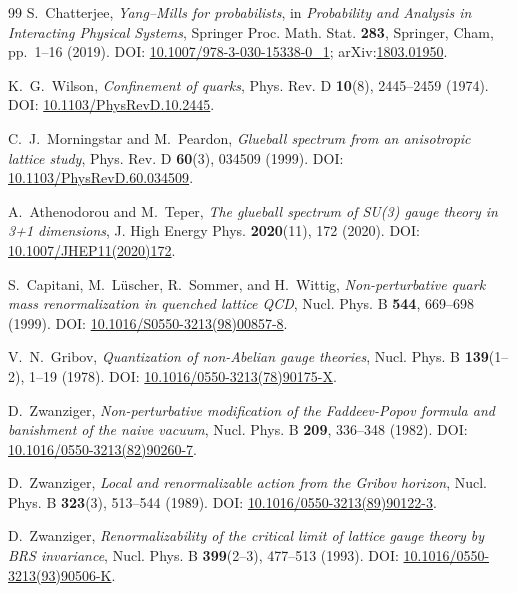\documentclass[11pt,a4paper]{amsart}
\theoremstyle{definition}
\begin{document}
\begin{thebibliography}{99}
S.~Chatterjee, \emph{Yang--Mills for probabilists}, in \emph{Probability and Analysis in Interacting Physical Systems}, Springer Proc. Math. Stat. \textbf{283}, Springer, Cham, pp.~1--16 (2019). DOI: \href{https://doi.org/10.1007/978-3-030-15338-0_1}{10.1007/978-3-030-15338-0\_1}; arXiv:\href{https://arxiv.org/abs/1803.01950}{1803.01950}.

K.~G.~Wilson, \emph{Confinement of quarks}, Phys. Rev. D \textbf{10}(8), 2445--2459 (1974). DOI: \href{https://doi.org/10.1103/PhysRevD.10.2445}{10.1103/PhysRevD.10.2445}.

C.~J.~Morningstar and M.~Peardon, \emph{Glueball spectrum from an anisotropic lattice study}, Phys. Rev. D \textbf{60}(3), 034509 (1999). DOI: \href{https://doi.org/10.1103/PhysRevD.60.034509}{10.1103/PhysRevD.60.034509}.

A.~Athenodorou and M.~Teper, \emph{The glueball spectrum of SU(3) gauge theory in 3+1 dimensions}, J. High Energy Phys. \textbf{2020}(11), 172 (2020). DOI: \href{https://doi.org/10.1007/JHEP11(2020)172}{10.1007/JHEP11(2020)172}.

S.~Capitani, M.~L\"uscher, R.~Sommer, and H.~Wittig, \emph{Non-perturbative quark mass renormalization in quenched lattice QCD}, Nucl. Phys. B \textbf{544}, 669--698 (1999). DOI: \href{https://doi.org/10.1016/S0550-3213(98)00857-8}{10.1016/S0550-3213(98)00857-8}.

V.~N.~Gribov, \emph{Quantization of non-Abelian gauge theories}, Nucl. Phys. B \textbf{139}(1--2), 1--19 (1978). DOI: \href{https://doi.org/10.1016/0550-3213(78)90175-X}{10.1016/0550-3213(78)90175-X}.

D.~Zwanziger, \emph{Non-perturbative modification of the Faddeev-Popov formula and banishment of the naive vacuum}, Nucl. Phys. B \textbf{209}, 336--348 (1982). DOI: \href{https://doi.org/10.1016/0550-3213(82)90260-7}{10.1016/0550-3213(82)90260-7}.

D.~Zwanziger, \emph{Local and renormalizable action from the Gribov horizon}, Nucl. Phys. B \textbf{323}(3), 513--544 (1989). DOI: \href{https://doi.org/10.1016/0550-3213(89)90122-3}{10.1016/0550-3213(89)90122-3}.

D.~Zwanziger, \emph{Renormalizability of the critical limit of lattice gauge theory by BRS invariance}, Nucl. Phys. B \textbf{399}(2--3), 477--513 (1993). DOI: \href{https://doi.org/10.1016/0550-3213(93)90506-K}{10.1016/0550-3213(93)90506-K}.


\end{thebibliography}
\end{document}
